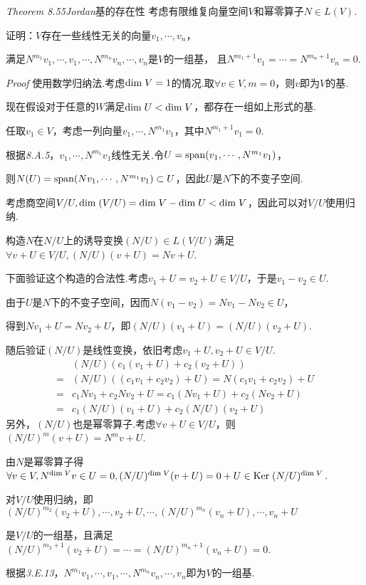 \textit{Theorem 8.55}\textit{Jordan}{\kaishu 基的存在性}
考虑有限维复向量空间\(V\)和幂零算子\(N \in L(V)\).

证明：\(V\)存在一些线性无关的向量\(v_1,\cdots,v_n\)，

满足\(N^{m_1}v_1,\cdots,v_1,\cdots,N^{m_n}v_n,\cdots,v_n\)是\(V\)的一组基，
且\(N^{m_1+1}v_1=\cdots=N^{m_n+1}v_n=0\).

\textit{Proof}
使用数学归纳法.考虑\(\mathrm{dim \;} V=1\)的情况.取\(\forall v \in V,m=0\)，则\(v\)即为\(V\)的基.

现在假设对于任意的\(W\)满足\(\mathrm{dim \;} U<\mathrm{dim \;} V\)，都存在一组如上形式的基.

任取\(v_1 \in V\)，考虑一列向量\(v_1,\cdots,N^{m_1}v_1\)，其中\(N^{m_1+1}v_1=0\).

根据\textit{8.A.5}，\(v_1,\cdots,N^{m_1}v_1\)线性无关.令\(U=\mathrm{span} (v_1,\cdots,N^{m_1}v_1)\)，

则\(N(U)=\mathrm{span} (Nv_1,\cdots,N^{m_1}v_1) \subset U\)，因此\(U\)是\(N\)下的不变子空间.

考虑商空间\(V/U,\mathrm{dim \;} (V/U)=\mathrm{dim \;} V-\mathrm{dim \;} U < \mathrm{dim \;} V\)，因此可以对\(V/U\)使用归纳.

构造\(N\)在\(N/U\)上的诱导变换\((N/U) \in L(V/U)\)满足\(\forall v+U \in V/U,(N/U)(v+U)=Nv+U\).

下面验证这个构造的合法性.考虑\(v_1+U=v_2+U \in V/U\)，于是\(v_1-v_2 \in U\).

由于\(U\)是\(N\)下的不变子空间，因而\(N(v_1-v_2)=Nv_1-Nv_2 \in U\)，

得到\(Nv_1+U=Nv_2+U\)，即\((N/U)(v_1+U)=(N/U)(v_2+U)\).

随后验证\((N/U)\)是线性变换，依旧考虑\(v_1+U,v_2+U \in V/U\).
    \begin{align*}
        &(N/U)(c_1(v_1+U)+c_2(v_2+U)) \\
        =&(N/U)((c_1v_1+c_2v_2)+U)=N(c_1v_1+c_2v_2)+U \\
        =&c_1Nv_1+c_2Nv_2+U=c_1(Nv_1+U)+c_2(Nv_2+U) \\
        =&c_1(N/U)(v_1+U)+c_2(N/U)(v_2+U) 
    \end{align*}
另外，\((N/U)\)也是幂零算子.考虑\(\forall v+U \in V/U\)，则\((N/U)^m(v+U)=N^m v+U\).

由\(N\)是幂零算子得\(\forall v \in V,N^{\mathrm{dim \;} V}v \in U=0,(N/U)^{\mathrm{dim \;} V}(v+U)=0+U \in \mathrm{Ker \;} (N/U)^{\mathrm{dim \;} V}\).

对\(V/U\)使用归纳，即\((N/U)^{m_2}(v_2+U),\cdots,v_2+U,\cdots,(N/U)^{m_n}(v_n+U),\cdots,v_n+U\)

是\(V/U\)的一组基，且满足\((N/U)^{m_2+1}(v_2+U)=\cdots=(N/U)^{m_n+1}(v_n+U)=0\).

根据\textit{3.E.13}，\(N^{m_1}v_1,\cdots,v_1,\cdots,N^{m_n}v_n,\cdots,v_n\)即为\(V\)的一组基.

